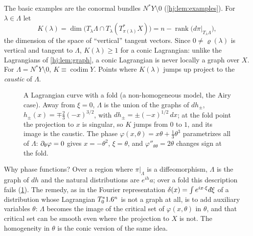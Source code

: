 The basic examples are the conormal bundles $N^*Y\setminus0$
(\cref{hj:lem:examples}).  For $\lambda\in\Lambda$ let
\begin{equation*}
  K(\lambda)=\dim\big(T_\lambda\Lambda\cap T_\lambda(T^*_{\pi(\lambda)}X)\big)
  =n-\operatorname{rank}\big(d\pi|_{T_\lambda\Lambda}\big),
\end{equation*}
the dimension of the space of ``vertical'' tangent vectors.  Since
$0\ne\varrho(\lambda)$ is vertical and tangent to $\Lambda$, $K(\lambda)\ge1$ for
a conic Lagrangian: unlike the Lagrangians of \cref{hj:lem:graph}, a conic
Lagrangian is never locally a graph over $X$.  For $\Lambda=N^*Y\setminus0$,
$K\equiv\operatorname{codim}Y$.  Points where $K(\lambda)$ jumps up project
to the \emph{caustic} of $\Lambda$.

\begin{figure}[ht]
  \centering
  \caption{A Lagrangian curve with a fold (a non-homogeneous model, the Airy
  case). Away from $\xi=0$, $\Lambda$ is the union of the graphs of $dh_\pm$,
  $h_\pm(x)=\mp\frac23(-x)^{3/2}$, with $dh_\pm=\pm(-x)^{1/2}\,dx$; at the fold point the projection to $x$ is
  singular, so $K$ jumps from $0$ to $1$, and its image is the caustic. The phase
  $\varphi(x,\theta)=x\theta+\frac13\theta^3$ parametrizes all of $\Lambda$:
  $\partial_\theta\varphi=0$ gives $x=-\theta^2$, $\xi=\theta$, and
  $\varphi''_{\theta\theta}=2\theta$ changes sign at the fold.}
  \label{hj:fig:fold}
\end{figure}

\begin{discussion}
Why phase functions? Over a region where $\pi|_\Lambda$ is a diffeomorphism,
$\Lambda$ is the graph of $dh$ and the natural distributions are $e^{ih}a$; over a
fold this description fails (\cref{hj:fig:fold}). The remedy, as in the Fourier
representation $\delta(x)=\int e^{ix\cdot\xi}\,\dbar\xi$ of a distribution whose
Lagrangian $T^*_01.6^n$ is not a graph at all, is to add auxiliary variables
$\theta$: $\Lambda$ becomes the image of the critical set of $\varphi(x,\theta)$ in
$\theta$, and that critical set can be smooth even where the projection to $X$ is
not. The homogeneity in $\theta$ is the conic version of the same idea.
\end{discussion}


